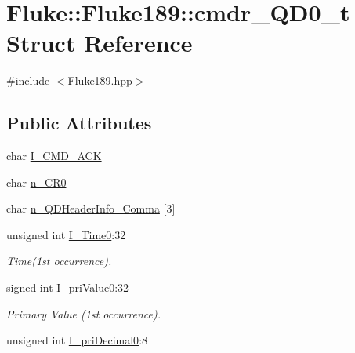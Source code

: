 \hypertarget{structFluke_1_1Fluke189_1_1cmdr__QD0__t}{
\section{Fluke::Fluke189::cmdr\_\-QD0\_\-t Struct Reference}
\label{structFluke_1_1Fluke189_1_1cmdr__QD0__t}
}


{\ttfamily \#include $<$Fluke189.hpp$>$}\subsection*{Public Attributes}
\begin{DoxyCompactItemize}
\item 
char \hyperlink{structFluke_1_1Fluke189_1_1cmdr__QD0__t_ab46dd039cec29950bccb5090537d6272}{I\_\-CMD\_\-ACK}
\item 
char \hyperlink{structFluke_1_1Fluke189_1_1cmdr__QD0__t_a052cc7ae576b3634f2eb8e1a4587c29e}{n\_\-CR0}
\item 
char \hyperlink{structFluke_1_1Fluke189_1_1cmdr__QD0__t_adbec2e8d0ea53d60baa33f2bad91e272}{n\_\-QDHeaderInfo\_\-Comma} \mbox{[}3\mbox{]}
\item 
\hypertarget{structFluke_1_1Fluke189_1_1cmdr__QD0__t_af559256ee7d41725c494325e3f3016dd}{
unsigned int \hyperlink{structFluke_1_1Fluke189_1_1cmdr__QD0__t_af559256ee7d41725c494325e3f3016dd}{I\_\-Time0}:32}
\label{structFluke_1_1Fluke189_1_1cmdr__QD0__t_af559256ee7d41725c494325e3f3016dd}

\begin{DoxyCompactList}\small\item\em Time(1st occurrence). \item\end{DoxyCompactList}\item 
\hypertarget{structFluke_1_1Fluke189_1_1cmdr__QD0__t_a456bd8fa7ab036aaff914b18c0fcb06e}{
signed int \hyperlink{structFluke_1_1Fluke189_1_1cmdr__QD0__t_a456bd8fa7ab036aaff914b18c0fcb06e}{I\_\-priValue0}:32}
\label{structFluke_1_1Fluke189_1_1cmdr__QD0__t_a456bd8fa7ab036aaff914b18c0fcb06e}

\begin{DoxyCompactList}\small\item\em Primary Value (1st occurrence). \item\end{DoxyCompactList}\item 
\hypertarget{structFluke_1_1Fluke189_1_1cmdr__QD0__t_a553620a1c27ecee3040af36b450fc702}{
unsigned int \hyperlink{structFluke_1_1Fluke189_1_1cmdr__QD0__t_a553620a1c27ecee3040af36b450fc702}{I\_\-priDecimal0}:8}
\label{structFluke_1_1Fluke189_1_1cmdr__QD0__t_a553620a1c27ecee3040af36b450fc702}


\end{DoxyCompactItemize}
